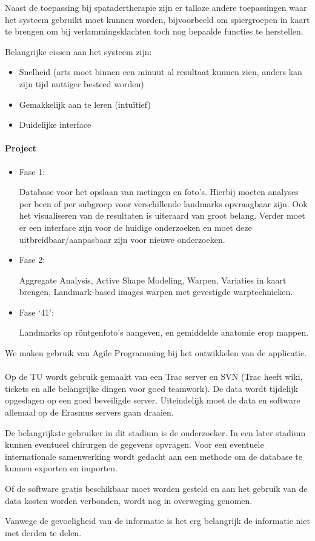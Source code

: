 Naast de toepassing bij spatadertherapie zijn er talloze andere toepassingen waar het systeem gebruikt moet kunnen worden, bijvoorbeeld om spiergroepen in kaart te brengen om bij verlammingsklachten toch nog bepaalde functies te herstellen. 

Belangrijke eissen aan het systeem zijn: 

\begin{itemize}
	\item Snelheid (arts moet binnen een minuut al resultaat kunnen zien, anders kan zijn tijd nuttiger besteed worden) 
	\item Gemakkelijk aan te leren (intu\"itief) 
	\item Duidelijke interface 
\end{itemize}

\paragraph{Project}
\begin{itemize}
\item Fase 1: 

Database voor het opslaan van metingen en foto's. Hierbij moeten analyses per been of per subgroep voor verschillende landmarks opvraagbaar zijn. Ook het visualiseren van de resultaten is uiteraard van groot belang. Verder moet er een interface zijn voor de huidige onderzoeken en moet deze uitbreidbaar/aanpasbaar zijn voor nieuwe onderzoeken. 

\item Fase 2: 

Aggregate Analysis, Active Shape Modeling, Warpen, Variaties in kaart brengen, Landmark-based images warpen met gevestigde warptechnieken. 

\item Fase `41': 

Landmarks op r\"ontgenfoto's aangeven, en gemiddelde anatomie erop mappen. 
\end{itemize}

We maken gebruik van Agile Programming bij het ontwikkelen van de applicatie.

\paragraph{}
Op de TU wordt gebruik gemaakt van een Trac server en SVN (Trac heeft wiki, tickets en alle belangrijke dingen voor goed teamwork). De data wordt tijdelijk opgeslagen op een goed beveiligde server. Uiteindelijk moet de data en software allemaal op de Erasmus servers gaan draaien. 

De belangrijkste gebruiker in dit stadium is de onderzoeker. In een later stadium kunnen eventueel chirurgen de gegevens opvragen. Voor een eventuele internationale samenwerking wordt gedacht aan een methode om de database te kunnen exporten en importen. 

Of de software gratis beschikbaar moet worden gesteld en aan het gebruik van de data kosten worden verbonden, wordt nog in overweging genomen. 

Vanwege de gevoeligheid van de informatie is het erg belangrijk de informatie niet met derden te delen. 
